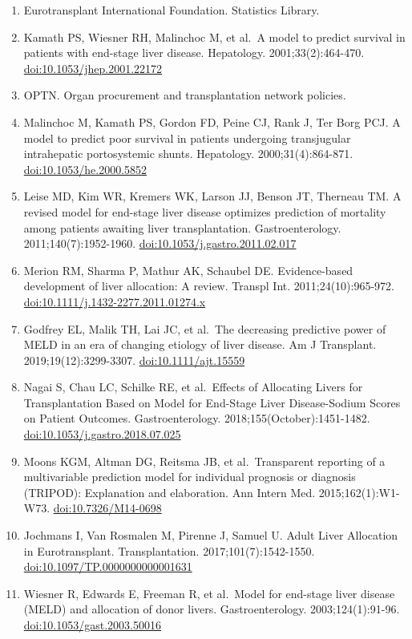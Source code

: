 \documentclass[11pt,english,]{book} %
\providecommand{\tightlist}{%
  \setlength{\itemsep}{0pt}\setlength{\parskip}{0pt}}
\begin{document}
\begin{enumerate}
\def\labelenumi{\arabic{enumi}.}
\tightlist
\item
  Eurotransplant International Foundation. Statistics Library.
\item
  Kamath PS, Wiesner RH, Malinchoc M, et al.~A model to predict survival in patients with end-stage liver disease. Hepatology. 2001;33(2):464-470. \url{doi:10.1053/jhep.2001.22172}
\item
  OPTN. Organ procurement and transplantation network policies.
\item
  Malinchoc M, Kamath PS, Gordon FD, Peine CJ, Rank J, Ter Borg PCJ. A model to predict poor survival in patients undergoing transjugular intrahepatic portosystemic shunts. Hepatology. 2000;31(4):864-871. \url{doi:10.1053/he.2000.5852}
\item
  Leise MD, Kim WR, Kremers WK, Larson JJ, Benson JT, Therneau TM. A revised model for end-stage liver disease optimizes prediction of mortality among patients awaiting liver transplantation. Gastroenterology. 2011;140(7):1952-1960. \url{doi:10.1053/j.gastro.2011.02.017}
\item
  Merion RM, Sharma P, Mathur AK, Schaubel DE. Evidence-based development of liver allocation: A review. Transpl Int. 2011;24(10):965-972. \url{doi:10.1111/j.1432-2277.2011.01274.x}
\item
  Godfrey EL, Malik TH, Lai JC, et al.~The decreasing predictive power of MELD in an era of changing etiology of liver disease. Am J Transplant. 2019;19(12):3299-3307. \url{doi:10.1111/ajt.15559}
\item
  Nagai S, Chau LC, Schilke RE, et al.~Effects of Allocating Livers for Transplantation Based on Model for End-Stage Liver Disease-Sodium Scores on Patient Outcomes. Gastroenterology. 2018;155(October):1451-1482. \url{doi:10.1053/j.gastro.2018.07.025}
\item
  Moons KGM, Altman DG, Reitsma JB, et al.~Transparent reporting of a multivariable prediction model for individual prognosis or diagnosis (TRIPOD): Explanation and elaboration. Ann Intern Med. 2015;162(1):W1-W73. \url{doi:10.7326/M14-0698}
\item
  Jochmans I, Van Rosmalen M, Pirenne J, Samuel U. Adult Liver Allocation in Eurotransplant. Transplantation. 2017;101(7):1542-1550. \url{doi:10.1097/TP.0000000000001631}
\item
  Wiesner R, Edwards E, Freeman R, et al.~Model for end-stage liver disease (MELD) and allocation of donor livers. Gastroenterology. 2003;124(1):91-96. \url{doi:10.1053/gast.2003.50016}

\end{enumerate}
\end{document}
